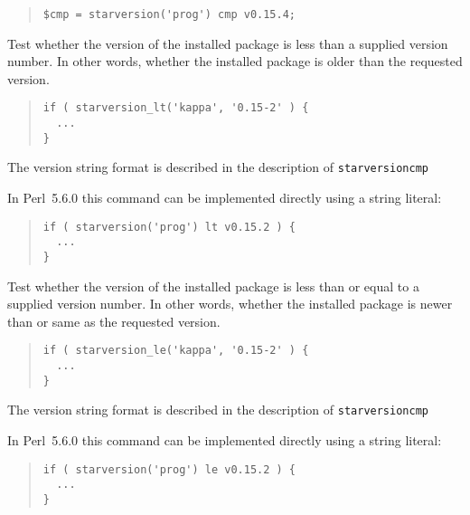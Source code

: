 \documentclass[twoside,11pt]{article}
\newenvironment{myquote}{\begin{quote}\begin{small}}{\end{small}\end{quote}}
\newcommand{\perl}{\xref{\textsf{Perl}}{sun193}{}}
\newcommand{\xref}[3]{#1}
\renewcommand{\_}{\texttt{\symbol{95}}}
\begin{document}
\begin{description}
\begin{myquote}
\begin{verbatim}
$cmp = starversion('prog') cmp v0.15.4;
\end{verbatim}
\end{myquote} %

\item[starversion\_lt] \mbox{}

  Test whether the version of the installed package is less than a supplied
  version number. In other words, whether the installed package is older than
  the requested version.

\begin{myquote}
\begin{verbatim}
if ( starversion_lt('kappa', '0.15-2' ) {
  ...
}
\end{verbatim}
\end{myquote}

The version string format is described in the description of
\texttt{starversion\_cmp}



In \perl\ 5.6.0 this command can be implemented directly using a string literal:

\begin{myquote}
\begin{verbatim}
if ( starversion('prog') lt v0.15.2 ) {
  ...
}
\end{verbatim}
\end{myquote}

\item[starversion\_le] \mbox{}

Test whether the version of the installed package is less than
or equal to a supplied version number. In other words, whether the installed
package is newer than or same as the requested version.

\begin{myquote}
\begin{verbatim}
if ( starversion_le('kappa', '0.15-2' ) {
  ...
}
\end{verbatim}
\end{myquote}

The version string format is described in the description of
\texttt{starversion\_cmp}



In \perl\ 5.6.0 this command can be implemented directly using a
string literal:

\begin{myquote}
\begin{verbatim}
if ( starversion('prog') le v0.15.2 ) {
  ...
}
\end{verbatim}
\end{myquote}


\end{description}
\end{document}
